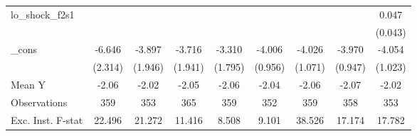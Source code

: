 {\begin{tabular}{l*{8}{c}}
\addlinespace
lo\_shock\_f2s1&                     &                     &                     &                     &                     &                     &                     &       0.047         \\
            &                     &                     &                     &                     &                     &                     &                     &     (0.043)         \\
\addlinespace
\_cons      &      -6.646\sym{***}&      -3.897\sym{*}  &      -3.716\sym{*}  &      -3.310\sym{*}  &      -4.006\sym{***}&      -4.026\sym{***}&      -3.970\sym{***}&      -4.054\sym{***}\\
            &     (2.314)         &     (1.946)         &     (1.941)         &     (1.795)         &     (0.956)         &     (1.071)         &     (0.947)         &     (1.023)         \\
\midrule
Mean Y      &       -2.06         &       -2.02         &       -2.05         &       -2.06         &       -2.04         &       -2.06         &       -2.07         &       -2.02         \\
Observations&         359         &         353         &         365         &         359         &         352         &         359         &         358         &         353         \\
Exc. Inst. F-stat&      22.496         &      21.272         &      11.416         &       8.508         &       9.101         &      38.526         &      17.174         &      17.782         \\
\bottomrule
\end{tabular}
}
